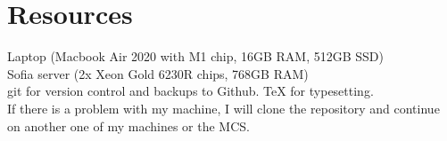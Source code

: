 \documentclass[a4paper]{article}
\begin{document}
\section{Resources}
Laptop (Macbook Air 2020 with M1 chip, 16GB RAM, 512GB SSD)\\
Sofia server (2x Xeon Gold 6230R chips, 768GB RAM)\\
git for version control and backups to Github. TeX for typesetting.\\
If there is a problem with my machine, I will clone the repository and continue on another one of my machines or the MCS.



\end{document}
